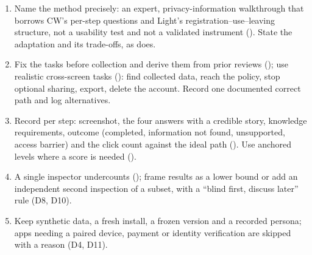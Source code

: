 \begin{thesisbox}
\begin{enumerate}[leftmargin=1.3em]
\item Name the method precisely: an expert, privacy-information walkthrough that borrows CW's per-step questions and Light's registration--use--leaving structure, not a usability test and not a validated instrument (). State the adaptation and its trade-offs, as  does.
\item Fix the tasks before collection and derive them from prior reviews (); use realistic cross-screen tasks (): find collected data, reach the policy, stop optional sharing, export, delete the account. Record one documented correct path and log alternatives.
\item Record per step: screenshot, the four answers with a credible story, knowledge requirements, outcome (completed, information not found, unsupported, access barrier) and the click count against the ideal path (). Use anchored levels where a score is needed ().
\item A single inspector undercounts (); frame results as a lower bound or add an independent second inspection of a subset, with a ``blind first, discuss later'' rule (D8, D10).
\item Keep synthetic data, a fresh install, a frozen version and a recorded persona; apps needing a paired device, payment or identity verification are skipped with a reason (D4, D11).
\end{enumerate}
\end{thesisbox}
